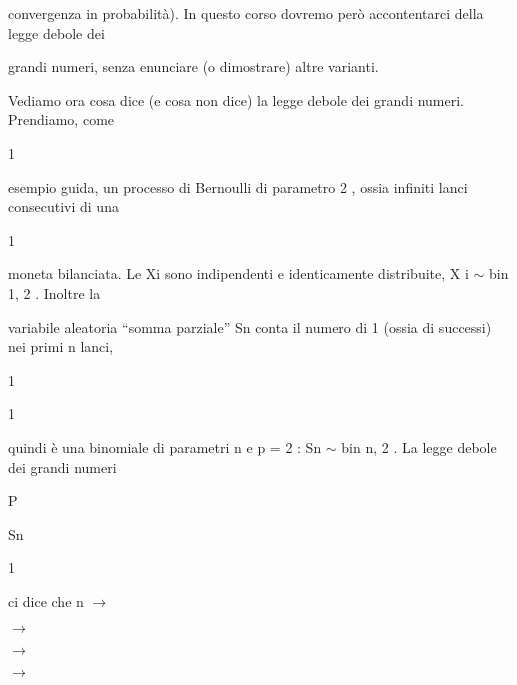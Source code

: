 \documentclass[a4paper,portrait,12pt]{article}
\begin{document}
\begin{flushleft}
convergenza in probabilit\`{a}). In questo corso dovremo per\`{o} accontentarci della legge debole dei
\end{flushleft}


\begin{flushleft}
grandi numeri, senza enunciare (o dimostrare) altre varianti.
\end{flushleft}


\begin{flushleft}
Vediamo ora cosa dice (e cosa non dice) la legge debole dei grandi numeri. Prendiamo, come
\end{flushleft}


1


\begin{flushleft}
esempio guida, un processo di Bernoulli di parametro 2 , ossia infiniti lanci consecutivi di una
\end{flushleft}


1


\begin{flushleft}
moneta bilanciata. Le Xi sono indipendenti e identicamente distribuite, X i $\sim$ bin 1, 2 . Inoltre la
\end{flushleft}


\begin{flushleft}
variabile aleatoria {``}somma parziale'' Sn conta il numero di 1 (ossia di successi) nei primi n lanci,
\end{flushleft}


1


1


\begin{flushleft}
quindi \`{e} una binomiale di parametri n e p = 2 : Sn $\sim$ bin n, 2 . La legge debole dei grandi numeri
\end{flushleft}


\begin{flushleft}
P
\end{flushleft}


\begin{flushleft}
Sn
\end{flushleft}


1


\begin{flushleft}
ci dice che n $\rightarrow$
\end{flushleft}


$\rightarrow$


$\rightarrow$


$\rightarrow$
\end{document}
